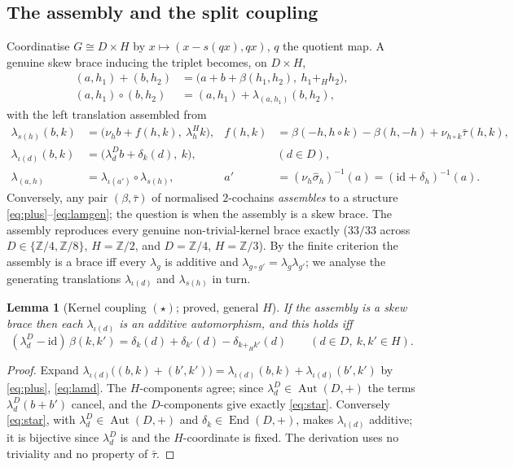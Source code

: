 \documentclass[11pt,reqno]{amsart}
\theoremstyle{plain}
\newtheorem{lemma}[theorem]{Lemma}
\theoremstyle{definition}
\newcommand{\Z}{\mathbb{Z}}
\newcommand{\id}{\mathrm{id}}
\newcommand{\Aut}{\operatorname{Aut}}
\newcommand{\End}{\operatorname{End}}
\newcommand{\shat}{\widehat{\sigma}}
\newcommand{\lD}{\lambda^{D}}
\newcommand{\lH}{\lambda^{H}}
\newcommand{\iot}{\iota}
\begin{document}
\subsection{The assembly and the split coupling}
Coordinatise $G\cong D\times H$ by $x\mapsto(x-s(qx),qx)$, $q$ the quotient map. A genuine
skew brace inducing the triplet becomes, on $D\times H$,
\begin{align}
(a,h_1)+(b,h_2)&=\big(a+b+\beta(h_1,h_2),\ h_1+_Hh_2\big),\label{eq:plus}\\
(a,h_1)\circ(b,h_2)&=(a,h_1)+\lambda_{(a,h_1)}(b,h_2),\label{eq:circ}
\end{align}
with the left translation assembled from
\begin{align}
\lambda_{s(h)}(b,k)&=\big(\nu_h b+f(h,k),\ \lH_h k\big),
& f(h,k)&=\beta(-h,h\circ k)-\beta(h,-h)+\nu_{h\circ k}\bar\tau(h,k),\label{eq:lamsh}\\
\lambda_{\iot(d)}(b,k)&=\big(\lD_d b+\delta_k(d),\ k\big),&&(d\in D),\label{eq:lamd}\\
\lambda_{(a,h)}&=\lambda_{\iot(a')}\circ\lambda_{s(h)},
& a'&=(\nu_h\shat_h)^{-1}(a)=(\id+\delta_h)^{-1}(a).\label{eq:lamgen}
\end{align}
Conversely, any pair $(\beta,\bar\tau)$ of normalised $2$-cochains \emph{assembles} to a
structure \eqref{eq:plus}--\eqref{eq:lamgen}; the question is when the assembly is a skew
brace. The assembly reproduces every genuine non-trivial-kernel brace exactly
($33/33$ across $D\in\{\Z/4,\Z/8\}$, $H=\Z/2$, and $D=\Z/4$, $H=\Z/3$). By the finite
criterion the assembly is a brace iff every $\lambda_g$ is additive and
$\lambda_{g\circ g'}=\lambda_g\lambda_{g'}$; we analyse the generating translations
$\lambda_{\iot(d)}$ and $\lambda_{s(h)}$ in turn.

\begin{lemma}[Kernel coupling $(\star)$; proved, general $H$]\label{lem:star}
If the assembly is a skew brace then each $\lambda_{\iot(d)}$ is an additive automorphism,
and this holds iff
\begin{equation}\label{eq:star}
(\lD_d-\id)\,\beta(k,k')=\delta_k(d)+\delta_{k'}(d)-\delta_{k+_Hk'}(d)
\qquad(d\in D,\ k,k'\in H).\tag{$\star$}
\end{equation}
\end{lemma}
\begin{proof}
Expand $\lambda_{\iot(d)}\big((b,k)+(b',k')\big)=\lambda_{\iot(d)}(b,k)+\lambda_{\iot(d)}(b',k')$
by \eqref{eq:plus}, \eqref{eq:lamd}. The $H$-components agree; since $\lD_d\in\Aut(D,+)$ the
terms $\lD_d(b+b')$ cancel, and the $D$-components give exactly \eqref{eq:star}. Conversely
\eqref{eq:star}, with $\lD_d\in\Aut(D,+)$ and $\delta_k\in\End(D,+)$, makes
$\lambda_{\iot(d)}$ additive; it is bijective since $\lD_d$ is and the $H$-coordinate is
fixed. The derivation uses no triviality and no property of $\bar\tau$.
\end{proof}
\end{document}
